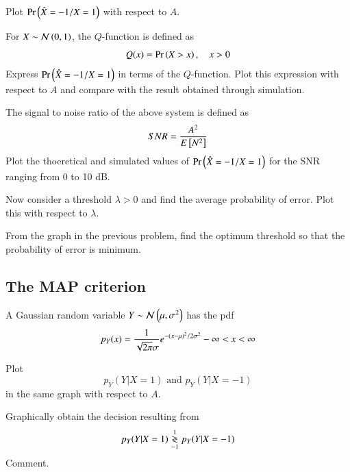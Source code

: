 %
\begin{problem}
Plot  $\Pr\left(\hat{X}=-1/X=1\right)$ with respect to $A$.
\end{problem}
%
\begin{problem}
For $X \sim \mathcal{N}\left(0,1\right)$, the $Q$-function is defined as
\begin{equation}
Q(x) = \Pr\left(X > x\right), \quad x > 0
\end{equation}
Express $\Pr\left(\hat{X}=-1/X=1\right)$ in terms of the $Q$-function. Plot this expression with respect to $A$ and compare with the result obtained through simulation.
\end{problem}
%
\begin{problem}
The signal to noise ratio of the above system is defined as 
\begin{equation}
SNR = \frac{A^2}{E\left[ N^2 \right]}
\end{equation}
Plot the thoeretical and simulated values of $\Pr\left(\hat{X}=-1/X=1\right)$ for the SNR ranging from 0 to 10 dB.
\end{problem}
%
\begin{problem}
Now consider a threshold $\lambda > 0$ and find the average probability of error. Plot this with respect to $\lambda$.
\end{problem}
%
\begin{problem}
From the graph in the previous problem, find the optimum threshold so that the probability of error is minimum.
\end{problem}
%
\subsection{The MAP criterion}
%
A Gaussian random variable $Y\sim\mathcal{N}\left(\mu,\sigma^2\right)$ has the pdf
%
\begin{equation}
p_{Y}(x) = \frac{1}{\sqrt{2\pi}\sigma}e^{-\left(x-\mu\right)^2/2\sigma^2} - \infty < x < \infty
\end{equation}
%
\begin{problem}
Plot
\begin{equation}
p_{Y}(Y|X=1) \text{ and } p_{Y}(Y|X=-1)
\end{equation}
in the same graph with respect to $A$.
\end{problem}

\begin{problem}
Graphically obtain the decision resulting from
\begin{equation}
p_{Y}(Y|X=1) \overset{1}{\underset{-1}{\gtrless}} p_{Y}(Y|X=-1)
\end{equation}
Comment.
\end{problem}
